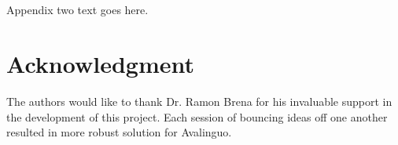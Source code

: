 \documentclass[journal]{IEEEtran}
\begin{document}
\section{}
Appendix two text goes here.


\section*{Acknowledgment}
The authors would like to thank Dr. Ramon Brena for his invaluable
support in the development of this project. Each session of bouncing
ideas off one another resulted in more robust solution for Avalinguo. 

\end{document}
